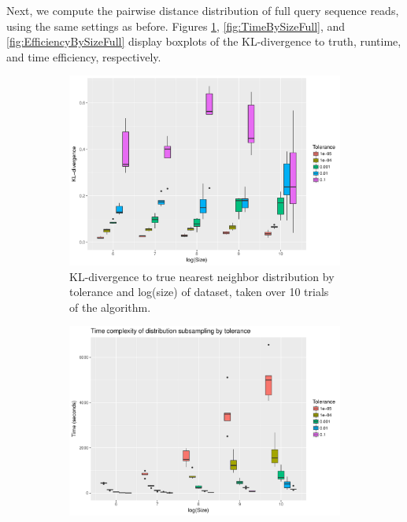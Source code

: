 \documentclass{article}
\begin{document}
Next, we compute the pairwise distance distribution of full query sequence reads, using the same settings as before.
Figures \ref{fig:DivBySizeFull}, \ref{fig:TimeBySizeFull}, and \ref{fig:EfficiencyBySizeFull} display boxplots of the KL-divergence to truth, runtime, and time efficiency, respectively.
\begin{figure}
	\begin{subfigure}{0.5\textwidth}
    	\includegraphics[width=\linewidth]{Figures/NearestNeighbor/div_by_size_and_tol.pdf}
    	\caption{KL-divergence to true nearest neighbor distribution by tolerance and log(size) of dataset, taken over 10 trials of the algorithm.}
    	\label{fig:DivBySizeFull}
	\end{subfigure}
	\begin{subfigure}{0.5\textwidth}
    	\includegraphics[width=\linewidth]{Figures/NearestNeighbor/time_by_size_and_tol.pdf}

\end{subfigure}
\end{figure}
\end{document}
